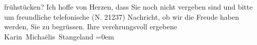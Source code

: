 \begin{ledgroupsized}[t]{13cm}
               frühstücken?\pend
           \pstart
           {\pb}Ich hoffe von Herzen, dass Sie noch nicht vergeben sind
               und bitte um freundliche telefonische (N. 21237)  Nachricht, ob wir die Freude haben werden, Sie zu begrüssen.\pend
           \pstart
           Ihre verehrungsvoll ergebene{\\[\baselineskip]}\spacefill\mbox{Karin Michaëlis Stangeland}\pend
           \leftskip=0em{}
         
         \endnumbering{}\end{ledgroupsized}  \newcommand{\dateiname}{L02582}\newcommand{\titel}{Karin Michaëlis an Arthur Schnitzler, 21. 10. 1912}\newcommand{\editorInnen}{Martin Anton Müller und Laura Untner}
      